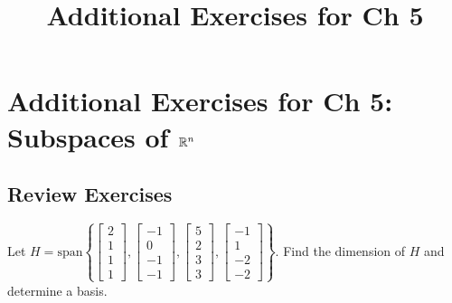 \documentclass{ximera}
\title{Additional Exercises for Ch 5} \license{CC BY-NC-SA 4.0}
\begin{document}
\begin{abstract}
\end{abstract}
\maketitle

\section*{Additional Exercises for Ch 5: Subspaces of $\mathbb{R}^n$}

\subsection*{Review Exercises}

\begin{problem}\label{prb:5.1} Let $H = \mbox{span}\left\{ \left[
\begin{array}{r}
2 \\
1 \\
1 \\
1
\end{array}
\right] ,\left[
\begin{array}{r}
-1 \\
0 \\
-1 \\
-1
\end{array}
\right] ,\left[
\begin{array}{r}
5 \\
2 \\
3 \\
3
\end{array}
\right] ,\left[
\begin{array}{r}
-1 \\
1 \\
-2 \\
-2
\end{array}
\right] \right\} .$ Find the dimension of $H$ and determine a basis.
\end{problem}
\end{document}
